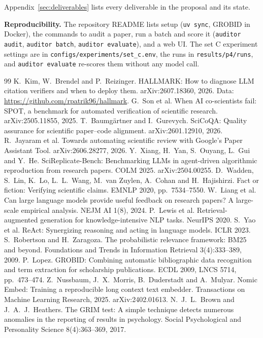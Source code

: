 \documentclass[11pt,a4paper]{article}
\begin{document}
Appendix~\ref{sec:deliverables} lists every deliverable in the proposal and its state.

\textbf{Reproducibility.} The repository README lists setup (\texttt{uv sync}, GROBID in Docker), the
commands to audit a paper, run a batch and score it (\texttt{auditor audit}, \texttt{auditor batch},
\texttt{auditor evaluate}), and a web UI. The set C experiment settings are in
\texttt{configs/experiments/set\_c.env}, the runs in \texttt{results/p4/runs}, and
\texttt{auditor evaluate} re-scores them without any model call.

\clearpage
\begin{thebibliography}{99}\small
{} K.~Kim, W.~Brendel and P.~Reizinger. HALLMARK: How to diagnose LLM citation verifiers and when to deploy them. arXiv:2607.18360, 2026. Data: \url{https://github.com/rpatrik96/hallmark}.
 G.~Son et al. When AI co-scientists fail: SPOT, a benchmark for automated verification of scientific research. arXiv:2505.11855, 2025.
 T.~Baumg\"artner and I.~Gurevych. SciCoQA: Quality assurance for scientific paper--code alignment. arXiv:2601.12910, 2026.
 R.~Jayaram et al. Towards automating scientific review with Google's Paper Assistant Tool. arXiv:2606.28277, 2026.
 Y.~Xiang, H.~Yan, S.~Ouyang, L.~Gui and Y.~He. SciReplicate-Bench: Benchmarking LLMs in agent-driven algorithmic reproduction from research papers. COLM 2025. arXiv:2504.00255.
 D.~Wadden, S.~Lin, K.~Lo, L.~L.~Wang, M.~van Zuylen, A.~Cohan and H.~Hajishirzi. Fact or fiction: Verifying scientific claims. EMNLP 2020, pp.~7534--7550.
 W.~Liang et al. Can large language models provide useful feedback on research papers? A large-scale empirical analysis. NEJM AI 1(8), 2024.
 P.~Lewis et al. Retrieval-augmented generation for knowledge-intensive NLP tasks. NeurIPS 2020.
 S.~Yao et al. ReAct: Synergizing reasoning and acting in language models. ICLR 2023.
 S.~Robertson and H.~Zaragoza. The probabilistic relevance framework: BM25 and beyond. Foundations and Trends in Information Retrieval 3(4):333--389, 2009.
 P.~Lopez. GROBID: Combining automatic bibliographic data recognition and term extraction for scholarship publications. ECDL 2009, LNCS 5714, pp.~473--474.
 Z.~Nussbaum, J.~X.~Morris, B.~Duderstadt and A.~Mulyar. Nomic Embed: Training a reproducible long context text embedder. Transactions on Machine Learning Research, 2025. arXiv:2402.01613.
 N.~J.~L.~Brown and J.~A.~J.~Heathers. The GRIM test: A simple technique detects numerous anomalies in the reporting of results in psychology. Social Psychological and Personality Science 8(4):363--369, 2017.

\end{thebibliography}
\end{document}
